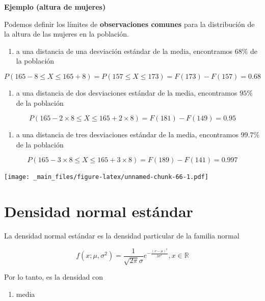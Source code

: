 \documentclass[
]{book}
\providecommand{\tightlist}{%
  \setlength{\itemsep}{0pt}\setlength{\parskip}{0pt}}
\begin{document}
\textbf{Ejemplo (altura de mujeres)}

Podemos definir los límites de \textbf{observaciones comunes} para la distribución de la altura de las mujeres en la población.

\begin{enumerate}
\def\labelenumi{\arabic{enumi})}
\tightlist
\item
  a una distancia de una desviación estándar de la media, encontramos \(68\%\) de la población
\end{enumerate}

\[P(165-8 \leq X \leq 165+8)=P(157 \leq X \leq 173)=F(173)-F(157)=0.68\]

\begin{enumerate}
\def\labelenumi{\arabic{enumi})}
\setcounter{enumi}{1}
\tightlist
\item
  a una distancia de dos desviaciones estándar de la media, encontramos \(95\%\) de la población
\end{enumerate}

\[P(165-2 \times 8 \leq X \leq 165+2\times 8)=F(181)-F(149)=0.95\]

\begin{enumerate}
\def\labelenumi{\arabic{enumi})}
\setcounter{enumi}{2}
\tightlist
\item
  a una distancia de tres desviaciones estándar de la media, encontramos \(99.7\%\) de la población
\end{enumerate}

\[P(165-3 \times 8 \leq X \leq 165+3\times 8)=F(189)-F(141)=0.997\]

\texttt{[image: \_main\_files/figure-latex/unnamed-chunk-66-1.pdf]}

\hypertarget{densidad-normal-estuxe1ndar}{%
\section{Densidad normal estándar}\label{densidad-normal-estuxe1ndar}}

La densidad normal estándar es la densidad particular de la familia normal

\[f(x; \mu, \sigma^2)=\frac{1}{\sqrt{2\pi}\sigma}e^{-\frac{(x-\mu)^2}{2\sigma^2}}, x \in {\mathbb R}\]

Por lo tanto, es la densidad con

\begin{enumerate}
\def\labelenumi{\arabic{enumi})}
\tightlist
\item
  media
\end{enumerate}
\end{document}
